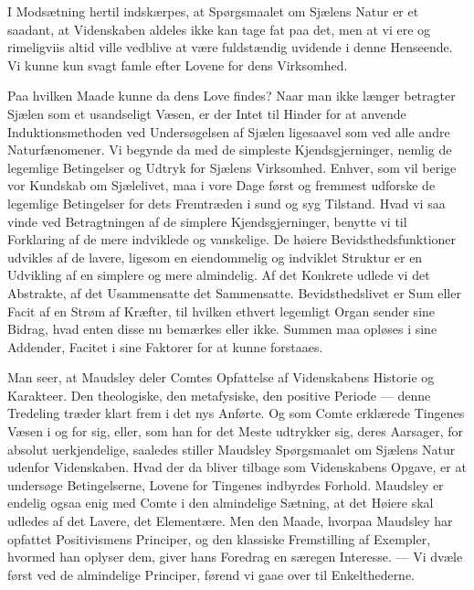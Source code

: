 \documentclass[12pt,a4paper,openany]{book}
\newcommand{\opage}[1]{\marginnote{\footnotesize\textit{[#1]}}}
\begin{document}
I Modsætning hertil indskærpes, at Spørgsmaalet om
Sjælens Natur er et saadant, at Videnskaben aldeles ikke kan
tage fat paa det, men at vi ere og rimeligviis altid ville vedblive
at være fuldstændig uvidende i denne Henseende. Vi
kunne kun svagt famle efter Lovene for dens Virksomhed.

Paa hvilken Maade kunne da dens Love findes? Naar
man ikke længer betragter Sjælen som et usandseligt Væsen,
er der Intet til Hinder for at anvende Induktionsmethoden
ved Undersøgelsen af Sjælen ligesaavel som ved
alle andre Naturfænomener. Vi begynde da med de simpleste
Kjendsgjerninger, nemlig de legemlige Betingelser og Udtryk
for Sjælens Virksomhed. Enhver, som vil berige vor Kundskab
om Sjælelivet, maa i vore Dage først og fremmest udforske
de legemlige Betingelser for dets Fremtræden i sund
og syg Tilstand. Hvad vi saa vinde ved Betragtningen af
de simplere Kjendsgjerninger, benytte vi til Forklaring af de
mere indviklede og vanskelige. De høiere Bevidsthedsfunktioner
\opage{311}udvikles af de lavere, ligesom en eiendommelig og indviklet
Struktur er en Udvikling af en simplere og mere almindelig.
Af det Konkrete udlede vi det Abstrakte, af det Usammensatte
det Sammensatte. Bevidsthedslivet er Sum eller Facit af
en Strøm af Kræfter, til hvilken ethvert legemligt Organ
sender sine Bidrag, hvad enten disse nu bemærkes eller ikke.
Summen maa opløses i sine Addender, Facitet i sine Faktorer
for at kunne forstaaes.

Man seer, at Maudsley deler Comtes Opfattelse af
Videnskabens Historie og Karakteer. Den theologiske, den
metafysiske, den positive Periode --- denne Tredeling træder
klart frem i det nys Anførte. Og som Comte erklærede
Tingenes Væsen i og for sig, eller, som han for det Meste
udtrykker sig, deres Aarsager, for absolut uerkjendelige, saaledes
stiller Maudsley Spørgsmaalet om Sjælens Natur
udenfor Videnskaben. Hvad der da bliver tilbage som
Videnskabens Opgave, er at undersøge Betingelserne, Lovene
for Tingenes indbyrdes Forhold. Maudsley er endelig ogsaa
enig med Comte i den almindelige Sætning, at det Høiere
skal udledes af det Lavere, det Elementære. Men den Maade,
hvorpaa Maudsley har opfattet Positivismens Principer, og
den klassiske Fremstilling af Exempler, hvormed han oplyser
dem, giver hans Foredrag en særegen Interesse. --- Vi dvæle
først ved de almindelige Principer, førend vi gaae over til
Enkelthederne.
\end{document}
